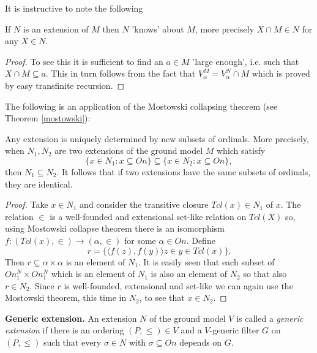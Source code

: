 It is instructive to note the following

\begin{fact}
If $N$ is an extension of $M$ then $N$ 'knows' about $M$, more precisely $X\cap M\in N$ for any $X\in N$.
\end{fact}

\begin{proof}
To see this it is sufficient to find an $a\in M$ 'large enough', i.e. such that $X\cap M\subseteq a$. This in turn follows
from the fact that $V_\alpha^M=V_\alpha^N\cap M$ which is proved by easy transfinite recursion.
\end{proof}

The following is an application of the Mostowski collapsing theorem (see Theorem \ref{mostowski}):

\begin{theorem}\label{models-determined-by-ordinals}
Any extension is uniquely determined by new subsets of ordinals. More precisely, when $N_1,N_2$ are two
extensions of the ground model $M$ which satisfy
$$ %
\{x\in N_1:x\subseteq On\}\subseteq\{x\in N_2:x\subseteq On\},
$$ %
then $N_1\subseteq N_2$. It follows that if two extensions have the same subsets of ordinals, they are identical.
\end{theorem}


\begin{proof}
Take $x\in N_1$ and consider the transitive closure $Tcl(x)\in N_1$ of $x$. The relation $\in$ is a well-founded and extensional set-like relation on $Tcl(X)$ so,
using Mostowski collapse theorem there is an isomorphism $f:(Tcl(x),\in)\to(\alpha,\in)$ for some $\alpha\in On$. Define
$$ %
r=\{\langle f(z),f(y)\rangle z\in y\in Tcl(x)\}.
$$ %
Then $r\subseteq\alpha\times\alpha$ is an element of $N_1$. It is easily seen that each subset of $On^N_1\times On^N_1$ which is an element of $N_1$ is also
an element of $N_2$ so that also $r\in N_2$. Since $r$ is well-founded, extensional and set-like we can again use the Mostowski theorem, this time in $N_2$, to
see that $x\in N_2$.
\end{proof}

\begin{definition}\label{generic-extension}{\bf Generic extension.}
An extension $N$ of the ground model $V$ is called a \emph{generic extension} if there is an ordering
$(P,\leq)\in V$ and a $V$-generic filter $G$ on $(P,\leq)$ such that every $\sigma\in N$ with $\sigma\subseteq On$ depends on $G$.
\end{definition}

